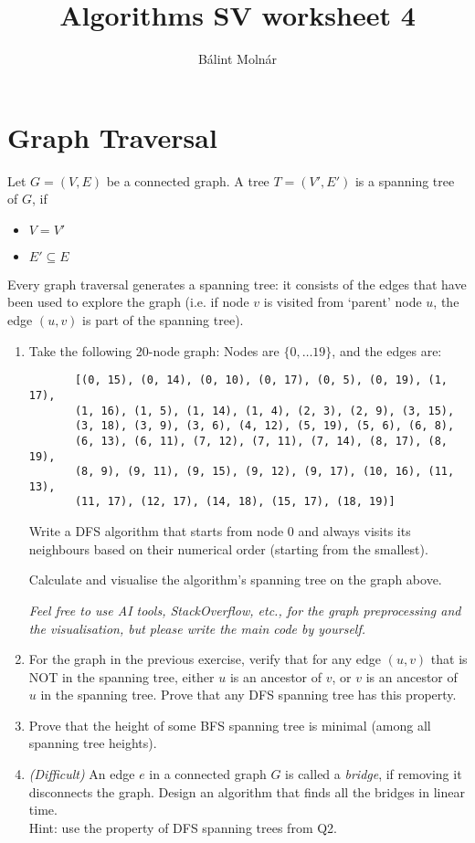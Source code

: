 \documentclass{article}
\title{{Algorithms SV worksheet 4}}
\author{Bálint Molnár}
\begin{document}
\maketitle


\section{Graph Traversal}

     Let $G=(V, E)$ be a connected graph. A tree $T=(V',E')$ is a spanning tree of $G$, if
    \begin{itemize}
        \item $V=V'$
        \item $E' \subseteq E$
    \end{itemize}


     Every graph traversal generates a spanning tree: it consists of the edges that have been used to explore the graph (i.e. if node $v$ is visited from `parent' node $u$, the edge $(u,v)$ is part of the spanning tree).
\begin{enumerate}
    \item
     
    

    
   Take the following 20-node graph: Nodes are $\{ 0,\dots 19\}$, and the edges are: 
   \begin{verbatim}
       [(0, 15), (0, 14), (0, 10), (0, 17), (0, 5), (0, 19), (1, 17),
       (1, 16), (1, 5), (1, 14), (1, 4), (2, 3), (2, 9), (3, 15),
       (3, 18), (3, 9), (3, 6), (4, 12), (5, 19), (5, 6), (6, 8),
       (6, 13), (6, 11), (7, 12), (7, 11), (7, 14), (8, 17), (8, 19),
       (8, 9), (9, 11), (9, 15), (9, 12), (9, 17), (10, 16), (11, 13),
       (11, 17), (12, 17), (14, 18), (15, 17), (18, 19)]
   \end{verbatim}

    Write a DFS algorithm that starts from node $0$ and always visits its neighbours based on their numerical order (starting from the smallest).

    Calculate and visualise the algorithm's spanning tree on the graph above.
   
    \emph{Feel free to use AI tools, StackOverflow, etc., for the graph preprocessing and the visualisation, but please write the main code by yourself.}
    \item For the graph in the previous exercise, verify that for any edge $(u,v)$ that is NOT in the spanning tree, either $u$ is an ancestor of $v$, or $v$ is an ancestor of $u$ in the spanning tree. Prove that any DFS spanning tree has this property.
    \item Prove that the height of \color{red} some \color{black} BFS spanning tree is minimal (among all spanning tree heights).
    \item \emph{(Difficult)} An edge $e$ in a connected graph $G$ is called a \emph{bridge}, if removing it disconnects the graph. Design an algorithm that finds all the bridges in linear time.\\ Hint: use the property of DFS spanning trees from Q2.
\end{enumerate}
\end{document}

